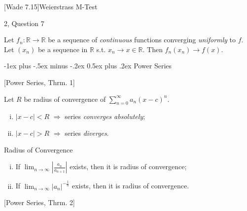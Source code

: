 \documentclass[10pt]{article} %
\makeatletter
\newcommand{\cw}[1]{[Wade #1]}
\newcommand{\cws}[2]{#1, Question #2}
\renewcommand{\section}{\@startsection{section}{1}{0mm}%
                                {-1ex plus -.5ex minus -.2ex}%
                                {0.5ex plus .2ex}%
                                {\normalfont\large\bfseries}}
\makeatother
\begin{document}
\begin{multicols}{3}
\begin{theorem}{\cw{7.15}}{Weierstrass M-Test}
\end{theorem}

\begin{workshop}{\cws{2}{7}}{}

    Let $f_n: \mathbb{R} \to \mathbb{R}$ be a sequence of \emph{continuous} functions converging \emph{uniformly} to $f$. Let $(x_n)$ be a sequence in $\mathbb{R}$ s.t. $x_n \to x \in \mathbb{R}$. Then $f_n(x_n) \to f(x)$.

\end{workshop}


\section{Power Series}

\begin{theorem}{[Power Series, Thrm. 1]}{}

    Let $R$ be radius of convergence of $\sum_{n=0}^{\infty} a_n (x - c)^n$.

        \begin{enumerate}[(i)]
            \setlength{\parskip}{0em}
            \item $|x - c| < R$ $\Rightarrow$ series \emph{converges absolutely};
            \item $|x - c| > R$ $\Rightarrow$ series \emph{diverges}.
        \end{enumerate}

\end{theorem}

\begin{exercise}{}{Radius of Convergence}

    \begin{enumerate}[(i)]
        \setlength{\parskip}{0em}
        \item If $\lim_{n \to \infty} \left|\frac{a_n}{a_{n+1}}\right|$ exists, then it is radius of convergence;
        \item If $\lim_{n \to \infty} |a_n|^{-\frac{1}{n}}$ exists, then it is radius of convergence.
    \end{enumerate}

\end{exercise}

\begin{theorem}{[Power Series, Thrm. 2]}{}


\end{theorem}
\end{multicols}
\end{document}
